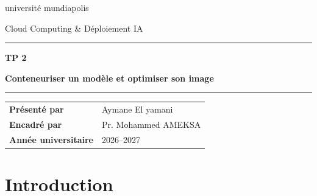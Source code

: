 \documentclass[11pt,a4paper]{report}
\begin{document}
\begin{titlepage}
\thispagestyle{empty}
\centering

\vspace*{2.5cm}

{\large université mundiapolis\par}
\vspace{0.3cm}
{\large Cloud Computing \& Déploiement IA\par}

\vspace{2.5cm}

{\color{accent}\rule{\textwidth}{0.8pt}\par}

\vspace{0.8cm}

{\Huge\bfseries TP 2\par}

\vspace{0.5cm}

{\LARGE\bfseries Conteneuriser un modèle et optimiser son image\par}

\vspace{0.8cm}

{\color{accent}\rule{\textwidth}{0.8pt}\par}

\vfill

\begin{minipage}{0.7\textwidth}
\centering
\begin{tabular}{@{}ll@{}}
\textbf{Présenté par} & Aymane El yamani \\
\textbf{Encadré par} & Pr. Mohammed AMEKSA \\
\textbf{Année universitaire} & 2026--2027 \\
\end{tabular}
\end{minipage}

\vfill


\vspace{1.5cm}

\end{titlepage}

\tableofcontents
\clearpage
\listoftables
\clearpage
\listoffigures
\newpage

\chapter{Introduction}
\end{document}
